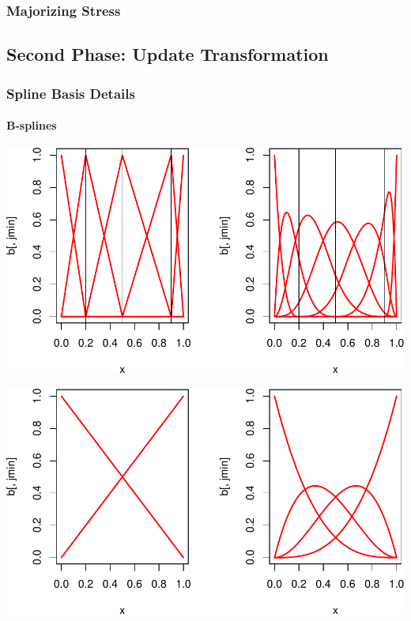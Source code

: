 \documentclass[
  12pt,
]{article}
\begin{document}
\subsubsection{Majorizing Stress}\label{majorizing-stress}

\subsection{Second Phase: Update Transformation}\label{second-phase-update-transformation}

\subsubsection{Spline Basis Details}\label{spline-basis-details}

\paragraph{B-splines}\label{b-splines}

\includegraphics{smacofManual_files/figure-latex/bsplines-1.pdf}

\includegraphics{smacofManual_files/figure-latex/bernstein-1.pdf}
\end{document}
